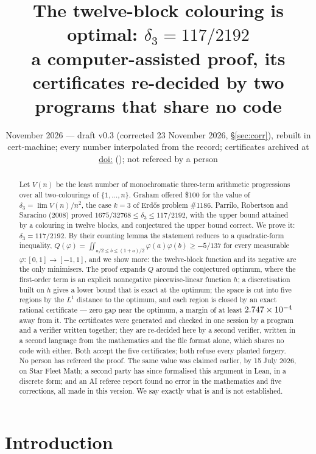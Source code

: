 \documentclass[11pt]{article}
\title{The twelve-block colouring is optimal: $\delta_3=117/2192$\\[2pt]
\large a computer-assisted proof, its certificates re-decided by two programs that share no code}
\author{\cmauthor}
\date{November 2026 --- draft v0.3 (corrected 23 November 2026, \S\ref{sec:corr}), rebuilt in cert-machine; every number interpolated from the record; certificates archived at \href{https://doi.org/\ArchiveDoi}{doi:\ArchiveDoi} (\ArchiveVersion); not refereed by a person}
\newcommand{\vphi}{\varphi}
\begin{document}
\maketitle

\begin{abstract}
Let $V(n)$ be the least number of monochromatic three-term arithmetic progressions over all two-colourings of $\{1,\dots,n\}$. Graham offered \$100 for the value of $\delta_3=\lim V(n)/n^2$, the case $k=3$ of Erd\H{o}s problem \#1186. Parrilo, Robertson and Saracino (2008) proved $1675/32768\le\delta_3\le117/2192$, with the upper bound attained by a colouring in twelve blocks, and conjectured the upper bound correct. We prove it: $\delta_3=117/2192$. By their counting lemma the statement reduces to a quadratic-form inequality, $Q(\vphi)=\iint_{a/2\le b\le(1+a)/2}\vphi(a)\vphi(b)\ge-5/137$ for every measurable $\vphi:[0,1]\to[-1,1]$, and we show more: the twelve-block function and its negative are the only minimisers. The proof expands $Q$ around the conjectured optimum, where the first-order term is an explicit nonnegative piecewise-linear function $h$; a discretisation built on $h$ gives a lower bound that is exact at the optimum; the space is cut into five regions by the $L^1$ distance to the optimum, and each region is closed by an exact rational certificate --- zero gap near the optimum, a margin of at least $2.747\times10^{-4}$ away from it. The certificates were generated and checked in one session by a program and a verifier written together; they are re-decided here by a second verifier, written in a second language from the mathematics and the file format alone, which shares no code with either. Both accept the five certificates; both refuse every planted forgery. No person has refereed the proof. The same value was claimed earlier, by 15 July 2026, on Star Fleet Math; a second party has since formalised this argument in Lean, in a discrete form; and an AI referee report found no error in the mathematics and five corrections, all made in this version. We say exactly what is and is not established.
\end{abstract}

\section{Introduction}
\end{document}
